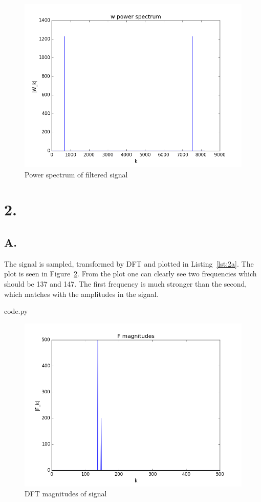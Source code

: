 \begin{figure}[H]
  \includegraphics[width=\textwidth]{1d}
  \caption{Power spectrum of filtered signal}
  \label{fig:filtered}
\end{figure}

\section*{2.}

\subsection*{A.}

The signal is sampled, transformed by DFT and plotted in Listing~\ref{lst:2a}.
The plot is seen in Figure~\ref{fig:2a}.
From the plot one can clearly see two frequencies which should be 137 and 147.
The first frequency is much stronger than the second, which matches with the amplitudes in the signal.


  {code.py}

\begin{figure}[H]
  \includegraphics[width=\textwidth]{2a}
  \caption{DFT magnitudes of signal}
  \label{fig:2a}
\end{figure}

